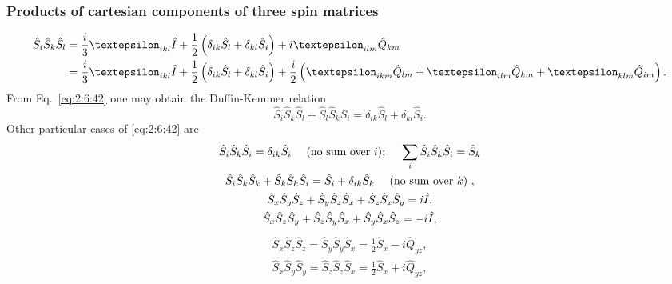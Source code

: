 \subsubsection{Products of  cartesian components of three spin matrices}
\begin{align}
\hat{S}_{i} \hat{S}_{k} \hat{S}_{l} & =\frac{i}{3} \varepsilon_{i k l} \hat{I}+\frac{1}{2}\left(\delta_{i k} \hat{S}_{l}+\delta_{k l} \hat{S}_{i}\right)+i \varepsilon_{i l m} \hat{Q}_{k m}  \notag\\
& =\frac{i}{3} \varepsilon_{i k l} \hat{I}+\frac{1}{2}\left(\delta_{i k} \hat{S}_{l}+\delta_{k l} \hat{S}_{i}\right)+\frac{i}{2}\left(\varepsilon_{i k m} \hat{Q}_{l m}+\varepsilon_{i l m} \hat{Q}_{k m}+\varepsilon_{k l m} \hat{Q}_{i m}\right) .\label{eq:2:6:42}
\end{align}
From Eq.~\eqref{eq:2:6:42} one may obtain the Duffin-Kemmer relation
\begin{equation}
\widehat{S}_{i} \widehat{S}_{k} \widehat{S}_{l}+\widehat{S}_{l} \widehat{S}_{k} \widehat{S}_{i}=\delta_{i k} \widehat{S}_{l}+\delta_{k l} \widehat{S}_{i}. \label{eq:2:6:43}
\end{equation}
Other particular cases of \eqref{eq:2:6:42} are
\begin{gather}
\hat{S}_{i} \hat{S}_{k} \hat{S}_{i}=\delta_{i k} \hat{S}_{i} \quad \text { (no sum over $i$); } \quad \sum_{i} \hat{S}_{i} \hat{S}_{k} \hat{S}_{i}=\hat{S}_{k}  \label{eq:2:6:44}\\
\hat{S}_{i} \hat{S}_{k} \hat{S}_{k}+\hat{S}_{k} \hat{S}_{k} \hat{S}_{i}=\hat{S}_{i}+\delta_{i k} \hat{S}_{k} \quad \text { (no sum over $k$) } , \label{eq:2:6:45}\\
\hat{S}_{x} \hat{S}_{y} \hat{S}_{z}+\hat{S}_{y} \hat{S}_{z} \hat{S}_{x}+\hat{S}_{z} \hat{S}_{x} \hat{S}_{y}=i \hat{I},  \notag\\
\hat{S}_{x} \hat{S}_{z} \hat{S}_{y}+\hat{S}_{z} \hat{S}_{y} \hat{S}_{x}+\hat{S}_{y} \hat{S}_{x} \hat{S}_{z}=-i \hat{I} ,\label{eq:2:6:46}
\end{gather}
\begin{equation}
\begin{gathered}
\hat{S}_{x} \hat{S}_{z} \hat{S}_{z}=\hat{S}_{y} \hat{S}_{y} \hat{S}_{x}=\frac{1}{2} \hat{S}_{x}-i \hat{Q}_{y z}  ,\\
\hat{S}_{x} \hat{S}_{y} \hat{S}_{y}=\hat{S}_{z} \hat{S}_{z} \hat{S}_{x}=\frac{1}{2} \hat{S}_{x}+i \hat{Q}_{y z},  
\end{gathered}\label{eq:2:6:47}
\end{equation}
